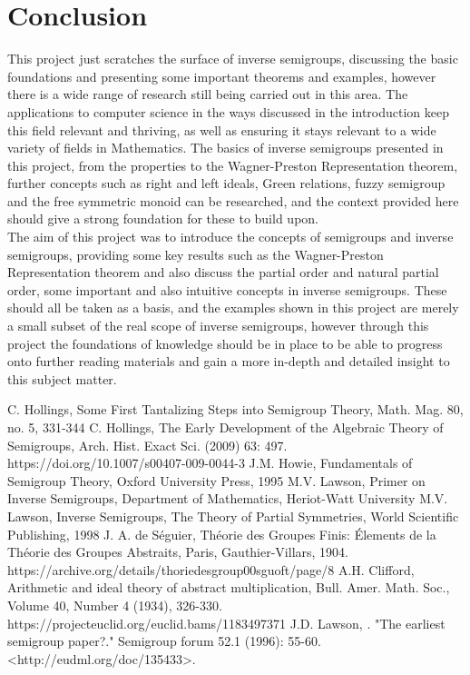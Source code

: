 \documentclass[12pt]{article}
\begin{document}
\section{Conclusion}
This project just scratches the surface of inverse semigroups, discussing the basic foundations and presenting some important theorems and examples, however there is a wide range of research still being carried out in this area. The applications to computer science in the ways discussed in the introduction keep this field relevant and thriving, as well as ensuring it stays relevant to a wide variety of fields in Mathematics. The basics of inverse semigroups presented in this project, from the properties to the Wagner-Preston Representation theorem, further concepts such as right and left ideals, Green relations, fuzzy semigroup and the free symmetric monoid can be researched, and the context provided here should give a strong foundation for these to build upon.\\
The aim of this project was to introduce the concepts of semigroups and inverse semigroups, providing some key results such as the Wagner-Preston Representation theorem and also discuss the partial order and natural partial order, some important and also intuitive concepts in inverse semigroups. These should all be taken as a basis, and the examples shown in this project are merely a small subset of the real scope of inverse semigroups, however through this project the foundations of knowledge should be in place to be able to progress onto further reading materials and gain a more in-depth and detailed insight to this subject matter.
\begin{thebibliography}{99}
C. Hollings, Some First Tantalizing Steps into Semigroup Theory, Math. Mag. 80, no. 5, 331-344
C. Hollings, The Early Development of the Algebraic Theory of Semigroups, Arch. Hist. Exact Sci. (2009) 63: 497. https://doi.org/10.1007/s00407-009-0044-3
J.M. Howie, Fundamentals of Semigroup Theory, Oxford University Press, 1995 
M.V. Lawson, Primer on Inverse Semigroups, Department of Mathematics, Heriot-Watt University
M.V. Lawson, Inverse Semigroups, The Theory of Partial Symmetries, World Scientific Publishing, 1998
 J. A. de Séguier, Théorie des Groupes Finis: Élements de la Théorie des Groupes Abstraits, Paris, Gauthier-Villars, 1904. https://archive.org/details/thoriedesgroup00sguoft/page/8
A.H. Clifford, Arithmetic and ideal theory of abstract multiplication, Bull. Amer. Math. Soc., Volume 40, Number 4 (1934), 326-330. https://projecteuclid.org/euclid.bams/1183497371
J.D. Lawson, . "The earliest semigroup paper?." Semigroup forum 52.1 (1996): 55-60. <http://eudml.org/doc/135433>.
\end{thebibliography}
\end{document}
